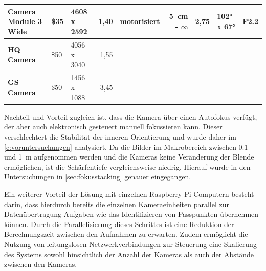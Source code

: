 \documentclass[./00PhotoBox.tex]{subfiles}
\begin{document}
\begin{table}[htbp]
{\begin{tabular}{l|l|l|r|lr|r|l|r|}
            \multicolumn{1}{|l|}{\textbf{Camera Module 3 Wide}} & \$35                         & \cellcolor[HTML]{9AFF99}4608 x 2592                                  & 1,40                                                              & \multicolumn{1}{l|}{\cellcolor[HTML]{9AFF99}motorisiert}                    & \cellcolor[HTML]{9AFF99}\SI{5}{\centi\metre} - $\infty$                  & 2,75                     & 102° x 67°               & F2.2                         \\ \hline
            \multicolumn{1}{|l|}{\textbf{HQ Camera}}            & \cellcolor[HTML]{FFCCC9}\$50 & 4056 x 3040                                                          & 1,55                                                              & \multicolumn{1}{l|}{\cellcolor[HTML]{FFCCC9}{\color[HTML]{000000} manuell}} & \cellcolor[HTML]{C0C0C0}                                                 & \cellcolor[HTML]{C0C0C0} & \cellcolor[HTML]{C0C0C0} & \cellcolor[HTML]{C0C0C0}     \\ \hline
            \multicolumn{1}{|l|}{\textbf{GS Camera}}            & \cellcolor[HTML]{FFCCC9}\$50 & 1456 x 1088                                                          & \cellcolor[HTML]{9AFF99}3,45                                      & \multicolumn{1}{l|}{\cellcolor[HTML]{FFCCC9}{\color[HTML]{000000} manuell}} & \cellcolor[HTML]{C0C0C0}                                                 & \cellcolor[HTML]{C0C0C0} & \cellcolor[HTML]{C0C0C0} & \cellcolor[HTML]{C0C0C0}     \\ \hline
        \end{tabular}
    }
\end{table}

Nachteil und Vorteil zugleich ist, dass die Kamera über einen Autofokus verfügt, der aber auch elektronisch gesteuert manuell fokussieren kann. Dieser verschlechtert die Stabilität der inneren Orientierung und wurde daher im \autoref{c:voruntersuchungen} analysiert. Da die Bilder im Makrobereich zwischen \SI{0,1}{} und \SI{1}{\metre} aufgenommen werden und die Kameras keine Veränderung der Blende ermöglichen, ist die Schärfentiefe vergleichsweise niedrig. Hierauf wurde in den Untersuchungen in \autoref{sec:fokusstacking} genauer eingegangen.

Ein weiterer Vorteil der Lösung mit einzelnen Raspberry-Pi-Computern besteht darin, dass hierdurch bereits die einzelnen Kameraeinheiten parallel zur Datenübertragung Aufgaben wie das Identifizieren von Passpunkten übernehmen können. Durch die Parallelisierung dieses Schrittes ist eine Reduktion der Berechnungszeit zwischen den Aufnahmen zu erwarten. Zudem ermöglicht die Nutzung von leitungslosen Netzwerkverbindungen zur Steuerung eine Skalierung des Systems sowohl hinsichtlich der Anzahl der Kameras als auch der Abstände zwischen den Kameras.
\end{document}
